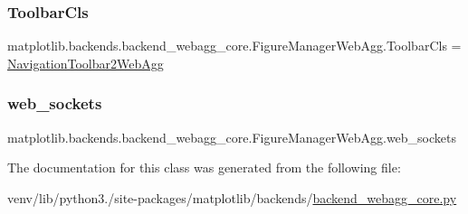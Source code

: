 \subsubsection{\texorpdfstring{Toolbar\+Cls}{ToolbarCls}}
{\footnotesize\ttfamily matplotlib.\+backends.\+backend\+\_\+webagg\+\_\+core.\+Figure\+Manager\+Web\+Agg.\+Toolbar\+Cls = \hyperlink{classmatplotlib_1_1backends_1_1backend__webagg__core_1_1NavigationToolbar2WebAgg}{Navigation\+Toolbar2\+Web\+Agg}\hspace{0.3cm}{\ttfamily [static]}}

\mbox{\label{classmatplotlib_1_1backends_1_1backend__webagg__core_1_1FigureManagerWebAgg_a06a75f6a4913bff6d468b3cf01448073}} 
\subsubsection{\texorpdfstring{web\+\_\+sockets}{web\_sockets}}
{\footnotesize\ttfamily matplotlib.\+backends.\+backend\+\_\+webagg\+\_\+core.\+Figure\+Manager\+Web\+Agg.\+web\+\_\+sockets}



The documentation for this class was generated from the following file\+:\begin{DoxyCompactItemize}
\item 
venv/lib/python3./site-\/packages/matplotlib/backends/\hyperlink{backend__webagg__core_8py}{backend\+\_\+webagg\+\_\+core.\+py}\end{DoxyCompactItemize}
